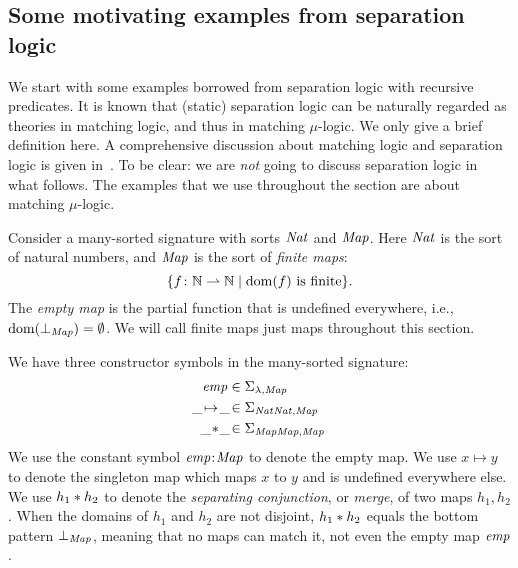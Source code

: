 \documentclass{amsart}
\begin{document}
\subsection{Some motivating examples from separation logic}
\label{sec:recursive_symbols:SL_examples}

We start with some examples borrowed from separation logic
with recursive predicates.
It is known that (static) separation logic can be naturally regarded
as theories in matching logic, and thus in matching $\mu$-logic.
We only give a brief definition here.
A comprehensive discussion about matching logic and separation logic
is given in~\cite{bibid}.
To be clear:
we are \emph{not} going to discuss separation logic in what follows.
The examples that we use throughout the section are about
matching $\mu$-logic.

Consider a many-sorted signature with sorts $\Nat$ and $\Map$.
Here $\Nat$ is the sort of natural numbers,
and $\Map$ is the sort of \emph{finite maps}:
$$\{ f \colon \nats \pfun \nats 
\mid \text{$\dom(f)$ is finite} \}. $$
The \emph{empty map}
is the partial function that is undefined everywhere,
i.e., $\dom(\bot_\Map) = \emptyset$.
We will call finite maps just maps throughout this section.

We have three constructor symbols in the many-sorted signature:
\begin{align}
\emp &\in \Sigma_{\lambda,\Map} \\
\z\mapsto\z  &\in \Sigma_{\Nat \Nat , \Map} \\
\z \merge \z &\in \Sigma_{\Map \Map , \Map}
\end{align}
We use the constant symbol $\emp \cln \Map$ to denote the empty map.
We use $x \mapsto y$ to denote the singleton map
which maps $x$ to $y$ and is undefined everywhere else. 
We use $h_1 \merge h_2$ to denote the \emph{separating conjunction},
or \emph{merge}, of two maps $h_1,h_2$.
When the domains of $h_1$ and $h_2$ are not disjoint, 
$h_1 \merge h_2$ equals the bottom pattern $\bot_\Map$,
meaning that no maps can match it, not even the empty map $\emp$.
\end{document}

